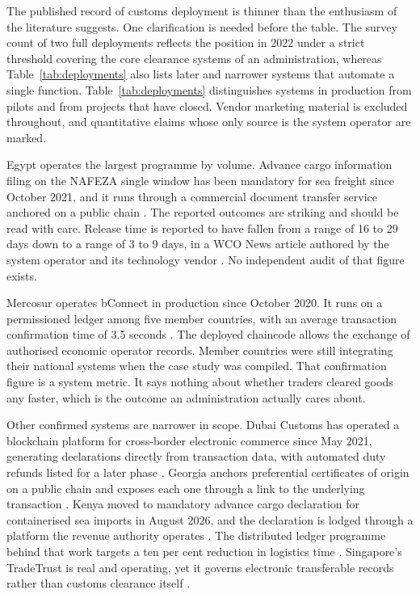 \documentclass[information,article,submit,moreauthors]{Definitions/mdpi}
\begin{document}
The published record of customs deployment is thinner than the enthusiasm of the literature suggests. One clarification is needed before the table. The survey count of two full deployments reflects the position in 2022 under a strict threshold covering the core clearance systems of an administration, whereas Table~\ref{tab:deployments} also lists later and narrower systems that automate a single function. Table~\ref{tab:deployments} distinguishes systems in production from pilots and from projects that have closed. Vendor marketing material is excluded throughout, and quantitative claims whose only source is the system operator are marked.

Egypt operates the largest programme by volume. Advance cargo information filing on the NAFEZA single window has been mandatory for sea freight since October 2021, and it runs through a commercial document transfer service anchored on a public chain \cite{nafeza2024aci,cargox2021polygon}. The reported outcomes are striking and should be read with care. Release time is reported to have fallen from a range of 16 to 29 days down to a range of 3 to 9 days, in a WCO News article authored by the system operator and its technology vendor \cite{wconews2022egypt}. No independent audit of that figure exists.

Mercosur operates bConnect in production since October 2020. It runs on a permissioned ledger among five member countries, with an average transaction confirmation time of 3.5 seconds \cite{wco2022casestudies}. The deployed chaincode allows the exchange of authorised economic operator records. Member countries were still integrating their national systems when the case study was compiled. That confirmation figure is a system metric. It says nothing about whether traders cleared goods any faster, which is the outcome an administration actually cares about.

Other confirmed systems are narrower in scope. Dubai Customs has operated a blockchain platform for cross-border electronic commerce since May 2021, generating declarations directly from transaction data, with automated duty refunds listed for a later phase \cite{unescap2024digitalizetrade}. Georgia anchors preferential certificates of origin on a public chain and exposes each one through a link to the underlying transaction \cite{wco2022disruptive}. Kenya moved to mandatory advance cargo declaration for containerised sea imports in August 2026, and the declaration is lodged through a platform the revenue authority operates \cite{kra2026acd}. The distributed ledger programme behind that work targets a ten per cent reduction in logistics time \cite{tma2026tlip}. Singapore's TradeTrust is real and operating, yet it governs electronic transferable records rather than customs clearance itself \cite{imda2024tradetrust}.
\end{document}
